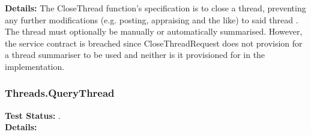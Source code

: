 \begin{flushleft}
\begin{flushleft}
	\textbf{Details:}
	The CloseThread function's specification is to close a thread, preventing any further modifications (e.g. posting, appraising and the like) to said thread . The thread must optionally be manually or automatically summarised. However, the service contract is breached since CloseThreadRequest does not provision for a thread summariser to be used and neither is it provisioned for in the implementation.  
\end{flushleft}

\subsubsection{Threads.QueryThread}
\begin{flushleft}
	\textbf{Test Status:} \emph{}. \\

	\textbf{Details:}
	
\end{flushleft}

\end{flushleft}
